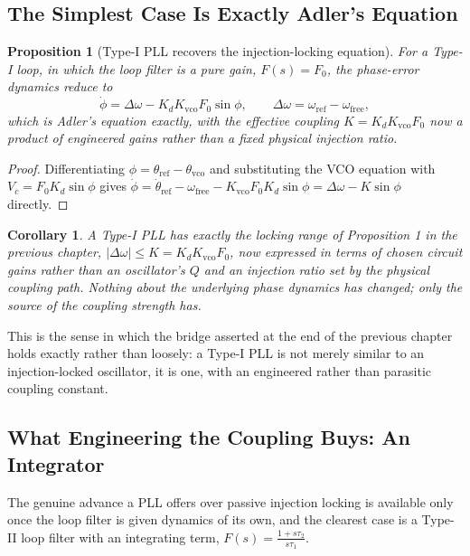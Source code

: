 \documentclass[12pt]{article}
\newtheorem{proposition}{Proposition}
\newtheorem{corollary}{Corollary}
\begin{document}
\subsection{The Simplest Case Is Exactly Adler's Equation}

\begin{proposition}[Type-I PLL recovers the injection-locking equation]
For a Type-I loop, in which the loop filter is a pure gain, $F(s) = F_0$, the phase-error dynamics reduce to
\[
\dot\phi = \Delta\omega - K_d K_{\text{vco}} F_0 \sin\phi, \qquad \Delta\omega = \omega_{\text{ref}} - \omega_{\text{free}},
\]
which is Adler's equation exactly, with the effective coupling $K = K_d K_{\text{vco}} F_0$ now a product of engineered gains rather than a fixed physical injection ratio.
\end{proposition}

\begin{proof}
Differentiating $\phi = \theta_{\text{ref}} - \theta_{\text{vco}}$ and substituting the VCO equation with $V_c = F_0 K_d \sin\phi$ gives $\dot\phi = \dot\theta_{\text{ref}} - \omega_{\text{free}} - K_{\text{vco}} F_0 K_d \sin\phi = \Delta\omega - K\sin\phi$ directly.
\end{proof}

\begin{corollary}
A Type-I PLL has exactly the locking range of Proposition 1 in the previous chapter, $|\Delta\omega| \leq K = K_d K_{\text{vco}} F_0$, now expressed in terms of chosen circuit gains rather than an oscillator's $Q$ and an injection ratio set by the physical coupling path. Nothing about the underlying phase dynamics has changed; only the source of the coupling strength has.
\end{corollary}

This is the sense in which the bridge asserted at the end of the previous chapter holds exactly rather than loosely: a Type-I PLL is not merely similar to an injection-locked oscillator, it is one, with an engineered rather than parasitic coupling constant.

\subsection{What Engineering the Coupling Buys: An Integrator}

The genuine advance a PLL offers over passive injection locking is available only once the loop filter is given dynamics of its own, and the clearest case is a Type-II loop filter with an integrating term, $F(s) = \frac{1 + s\tau_2}{s\tau_1}$.
\end{document}
